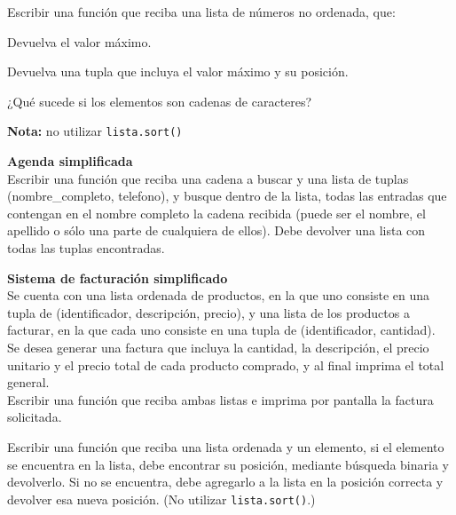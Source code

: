 \begin{ejercicio}
Escribir una función que reciba una lista de números no ordenada, que:
\begin{partes}
\item Devuelva el valor máximo.
\item Devuelva una tupla que incluya el valor máximo y su posición.
\item ¿Qué sucede si los elementos son cadenas de caracteres?
\end{partes}
{\bf Nota:} no utilizar \verb!lista.sort()!
\end{ejercicio}


\begin{ejercicio}
{\bf Agenda simplificada} \\
Escribir una función que reciba una cadena a buscar y una lista de tuplas
(nombre\_completo, telefono), y busque dentro de la lista, todas las
entradas que contengan en el nombre completo la cadena recibida (puede
ser el nombre, el apellido o sólo una parte de cualquiera de ellos).
Debe devolver una lista con todas las tuplas encontradas.
\end{ejercicio}


\begin{ejercicio}
{\bf Sistema de facturación simplificado} \\
Se cuenta con una lista ordenada de productos, en la que uno consiste en
una tupla de (identificador, descripción, precio), y una lista de los
productos a facturar, en la que cada uno consiste en una tupla de
(identificador, cantidad). \\
Se desea generar una factura que incluya la cantidad, la descripción, el
precio unitario y el precio total de cada producto comprado, y al final
imprima el total general. \\
Escribir una función que reciba ambas listas e imprima por
pantalla la factura solicitada.
\end{ejercicio}


\begin{ejercicio}
Escribir una función que reciba una lista ordenada y un elemento, si el
elemento se encuentra en la lista, debe encontrar su posición, mediante
búsqueda binaria y devolverlo.  Si no se encuentra, debe agregarlo a la
lista en la posición correcta y devolver esa nueva posición. (No utilizar
\verb!lista.sort()!.)
\end{ejercicio}

